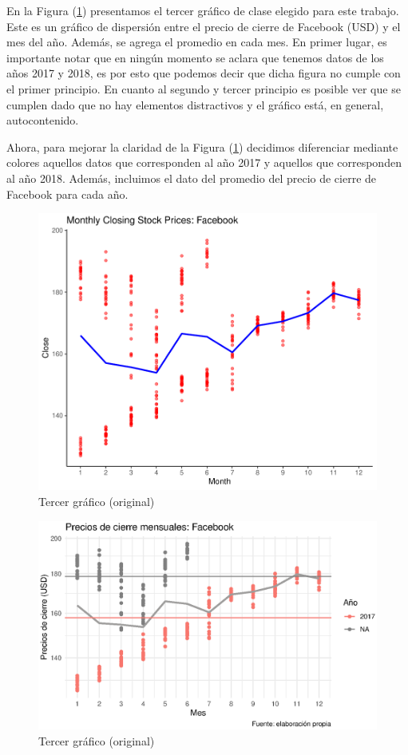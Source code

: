 \documentclass[12pt]{article}
\begin{document}
En la Figura (\ref{tercerooriginal}) presentamos el tercer gráfico de clase elegido para este trabajo. Este es un gráfico de dispersión entre el precio de cierre de Facebook (USD) y el mes del año. Además, se agrega el promedio en cada mes. En primer lugar, es importante notar que en ningún momento se aclara que tenemos datos de los años 2017 y 2018, es por esto que podemos decir que dicha figura no cumple con el primer principio. En cuanto al segundo y tercer principio es posible ver que se cumplen dado que no hay elementos distractivos y el gráfico está, en general, autocontenido. 

Ahora, para mejorar la claridad de la Figura (\ref{tercerooriginal}) decidimos diferenciar mediante colores aquellos datos que corresponden al año 2017 y aquellos que corresponden al año 2018. Además, incluimos el dato del promedio del precio de cierre de Facebook para cada año. 


\begin{figure}[htbp]
    \centering
\includegraphics[width = \textwidth]{graficos/tercergrafico_original_mod.pdf}
    \caption{Tercer gráfico (original)}
    \label{tercerooriginal}
\end{figure}


\begin{figure}[htbp]
    \centering
\includegraphics[width = \textwidth]{graficos/tercergrafico_modificado.eps}
    \caption{Tercer gráfico (original)}
    \label{terceromod}
\end{figure}








\end{document}
